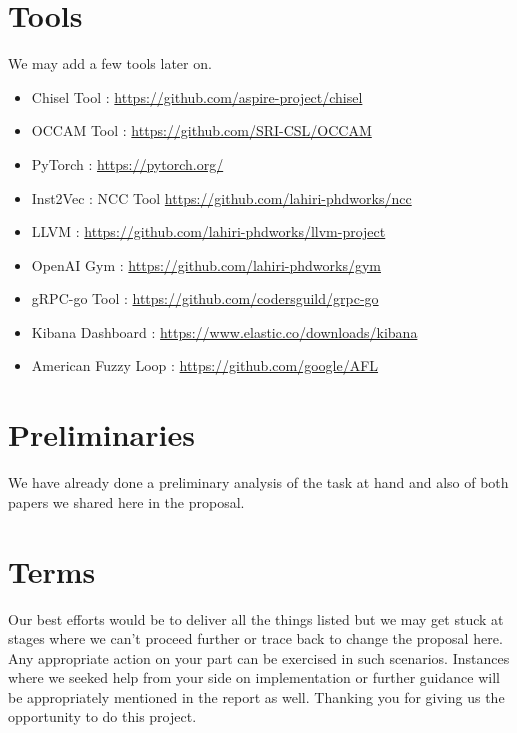 \documentclass{article} %
\begin{document}
\section*{Tools}
We may add a few tools later on.
\begin{itemize}
    \item Chisel Tool : \url{https://github.com/aspire-project/chisel}
    \item OCCAM Tool : \url{https://github.com/SRI-CSL/OCCAM}
    \item PyTorch : \url{https://pytorch.org/}
    \item Inst2Vec : NCC Tool \url{https://github.com/lahiri-phdworks/ncc}
    \item LLVM : \url{https://github.com/lahiri-phdworks/llvm-project}
    \item OpenAI Gym : \url{https://github.com/lahiri-phdworks/gym}
    \item gRPC-go Tool : \url{https://github.com/codersguild/grpc-go}
    \item Kibana Dashboard : \url{https://www.elastic.co/downloads/kibana}
    \item American Fuzzy Loop : \url{https://github.com/google/AFL}
\end{itemize}

\section*{Preliminaries}
We have already done a preliminary analysis of the task at hand and also of both papers we shared here in the proposal. 

\section*{Terms}
Our best efforts would be to deliver all the things listed but we may get stuck at stages where we can't proceed further or trace back to change the proposal here. Any appropriate action on your part can be exercised in such scenarios. Instances where we seeked help from your side on implementation or further guidance will be appropriately mentioned in the report as well. Thanking you for giving us the opportunity to do this project.  
\end{document}
